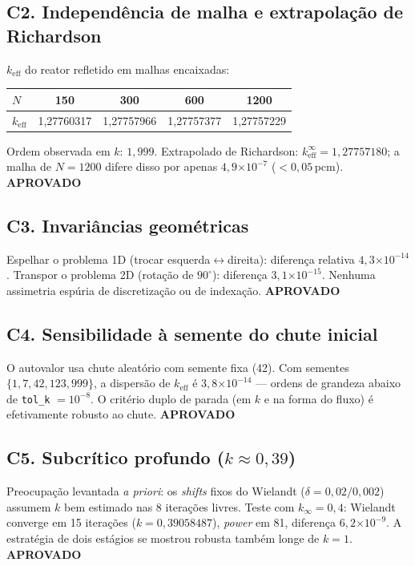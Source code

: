 \documentclass[11pt,a4paper]{article}
\newcommand{\keff}{k_{\text{eff}}}
\newcommand{\aprovado}{\textcolor{green!45!black}{\textbf{APROVADO}}}
\newcommand{\e}[1]{\ensuremath{\times 10^{#1}}}
\begin{document}
\subsection{C2. Independência de malha e extrapolação de Richardson}
$\keff$ do reator refletido em malhas encaixadas:

\begin{center}\small
\begin{tabular}{lcccc}
\toprule
$N$ & 150 & 300 & 600 & 1200 \\
\midrule
$\keff$ & 1{,}27760317 & 1{,}27757966 & 1{,}27757377 & 1{,}27757229 \\
\bottomrule
\end{tabular}
\end{center}
Ordem observada em $k$: $1{,}999$. Extrapolado de Richardson:
$\keff^\infty = 1{,}27757180$; a malha de $N=1200$ difere disso por apenas
$4{,}9\e{-7}$ ($<0{,}05$\,pcm). \hfill \aprovado

\subsection{C3. Invariâncias geométricas}
Espelhar o problema 1D (trocar esquerda$\leftrightarrow$direita): diferença
relativa $4{,}3\e{-14}$. Transpor o problema 2D (rotação de $90^\circ$):
diferença $3{,}1\e{-15}$. Nenhuma assimetria espúria de discretização ou de
indexação. \hfill \aprovado

\subsection{C4. Sensibilidade à semente do chute inicial}
O autovalor usa chute aleatório com semente fixa (42). Com sementes
$\{1, 7, 42, 123, 999\}$, a dispersão de $\keff$ é $3{,}8\e{-14}$ ---
ordens de grandeza abaixo de \texttt{tol\_k} $=10^{-8}$. O critério duplo de
parada (em $k$ e na forma do fluxo) é efetivamente robusto ao chute.
\hfill \aprovado

\subsection{C5. Subcrítico profundo ($k \approx 0{,}39$)}
Preocupação levantada \emph{a priori}: os \emph{shifts} fixos do Wielandt
($\delta = 0{,}02/0{,}002$) assumem $k$ bem estimado nas 8 iterações livres.
Teste com $k_\infty = 0{,}4$: Wielandt converge em 15 iterações
($k = 0{,}39058487$), \emph{power} em 81, diferença $6{,}2\e{-9}$. A
estratégia de dois estágios se mostrou robusta também longe de $k=1$.
\hfill \aprovado
\end{document}
